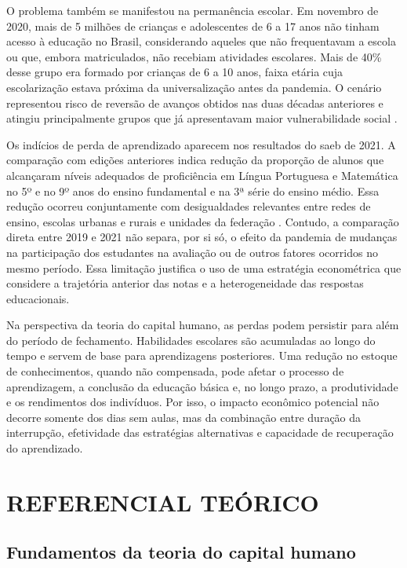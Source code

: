 \documentclass[
	12pt,				%
	openright,			%
	oneside,			%
	a4paper,			%
	brazil,				%
	]{article}
\begin{document}
O problema também se manifestou na permanência escolar. Em novembro de 2020,
mais de 5 milhões de crianças e adolescentes de 6 a 17 anos não tinham acesso à
educação no Brasil, considerando aqueles que não frequentavam a escola ou que,
embora matriculados, não recebiam atividades escolares. Mais de 40\% desse grupo
era formado por crianças de 6 a 10 anos, faixa etária cuja escolarização estava
próxima da universalização antes da pandemia. O cenário representou risco de
reversão de avanços obtidos nas duas décadas anteriores e atingiu principalmente
grupos que já apresentavam maior vulnerabilidade social
\cite{UNICEFCenpec2021_ExclusaoEscolar}.

Os indícios de perda de aprendizado aparecem nos resultados do \acrshort{saeb}
de 2021. A comparação com edições anteriores indica redução da proporção de alunos
que alcançaram níveis adequados de proficiência em Língua Portuguesa e
Matemática no 5º e no 9º anos do ensino fundamental e na 3ª série do ensino
médio. Essa redução ocorreu conjuntamente com desigualdades relevantes entre
redes de ensino, escolas urbanas e rurais e unidades da federação
\cite{BofMoraes2022_ImpactosPandemiaAprendizado}. Contudo, a comparação direta
entre 2019 e 2021 não separa, por si só, o efeito da pandemia de mudanças na
participação dos estudantes na avaliação ou de outros fatores ocorridos no
mesmo período. Essa limitação justifica o uso de uma estratégia econométrica que
considere a trajetória anterior das notas e a heterogeneidade das respostas
educacionais.

Na perspectiva da teoria do capital humano, as perdas podem persistir para além
do período de fechamento. Habilidades escolares são acumuladas ao longo do
tempo e servem de base para aprendizagens posteriores. Uma redução no estoque
de conhecimentos, quando não compensada, pode afetar o processo de aprendizagem, a
conclusão da educação básica e, no longo prazo, a produtividade e os rendimentos
dos indivíduos. Por isso, o impacto econômico potencial não decorre somente dos
dias sem aulas, mas da combinação entre duração da interrupção, efetividade das
estratégias alternativas e capacidade de recuperação do aprendizado.

\newpage
\section{REFERENCIAL TEÓRICO} \label{sec:referencial}


\subsection{Fundamentos da teoria do capital humano}
\end{document}
